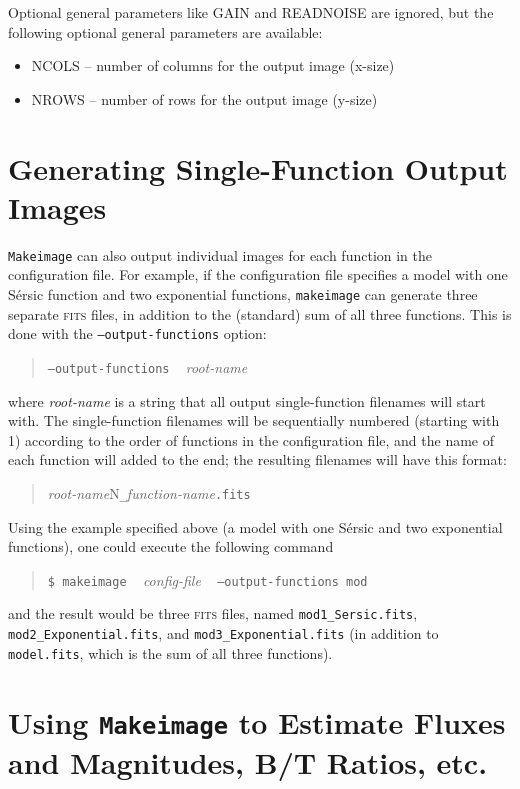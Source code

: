 \documentclass[10pt,a4paper,article]{memoir}
\newcommand{\makeimage}{\texttt{makeimage}}
\newcommand{\Makeimage}{\texttt{Makeimage}}
\begin{document}
Optional general parameters like GAIN and READNOISE are ignored, but the
following optional general parameters are available:

\begin{itemize}
\item NCOLS -- number of columns for the output image (x-size)

\item NROWS -- number of rows for the output image (y-size)

\end{itemize}




\section{Generating Single-Function Output Images}

\Makeimage{} can also output individual images for each function
in the configuration file. For example, if the configuration file specifies
a model with one S\'ersic function and two exponential functions, \makeimage{}
can generate three separate \textsc{fits} files, in addition to the (standard) sum of
all three functions.  This is done with the \texttt{--output-functions} option:
\begin{quote}
  \texttt{--output-functions} ~ \textit{root-name}
\end{quote}
where \textit{root-name} is a string that all output single-function filenames will
start with. The single-function filenames will be sequentially numbered (starting
with 1) according to the order of functions in the configuration file, and the
name of each function will added to the end; the resulting filenames will have
this format:
\begin{quote}
  \textit{root-name}{N}\texttt{\_}\textit{function-name}\texttt{.fits}
\end{quote}

Using the example specified above (a model with one S\'ersic and two exponential
functions), one could execute the following command
\begin{quote}
  \texttt{\$ \makeimage} ~ \textit{config-file} ~ \texttt{--output-functions mod}
\end{quote}
and the result would be three \textsc{fits} files, named \texttt{mod1\_Sersic.fits},
\texttt{mod2\_Exponential.fits}, and \texttt{mod3\_Exponential.fits} (in addition
to \texttt{model.fits}, which is the sum of all three functions).


\section{Using \Makeimage{} to Estimate Fluxes and Magnitudes, B/T Ratios, etc.}
\end{document}
